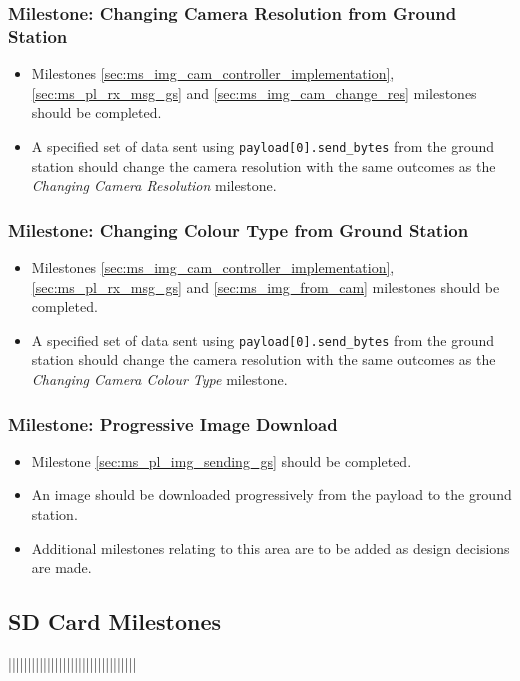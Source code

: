 	\subsubsection{Milestone: Changing Camera Resolution from Ground Station}
		\label{sec:ms_pl_img_gs_cam_res}
		\begin{itemize}
			\item 	Milestones \ref{sec:ms_img_cam_controller_implementation}, \ref{sec:ms_pl_rx_msg_gs} and 
				\ref{sec:ms_img_cam_change_res} milestones should be completed.
			\item 	A specified set of data sent using \verb+payload[0].send_bytes+
				from the ground station should change the camera resolution with 
				the same outcomes as the \emph{Changing Camera Resolution} milestone.
		\end{itemize}


	\subsubsection{Milestone: Changing Colour Type from Ground Station}
		\label{sec:ms_pl_img_gs_cam_colour_type}
		\begin{itemize}
			\item 	Milestones \ref{sec:ms_img_cam_controller_implementation}, \ref{sec:ms_pl_rx_msg_gs} and 
				\ref{sec:ms_img_from_cam} milestones should be completed.
			\item 	A specified set of data sent using \verb+payload[0].send_bytes+
				from the ground station should change the camera resolution with 
				the same outcomes as the \emph{Changing Camera Colour Type} milestone.
		\end{itemize}

	\subsubsection{Milestone: Progressive Image Download}
		\label{sec:ms_pl_img_gs_progressive_dl}
		\begin{itemize}
			\item 	Milestone \ref{sec:ms_pl_img_sending_gs} should be completed.
			\item 	An image should be downloaded progressively from the payload to the
				ground station.
			\item 	Additional milestones relating to this area are to be added as design decisions
				are made.
		\end{itemize}

\subsection{SD Card Milestones}
|||||||||||||||||||||||||||||||||

